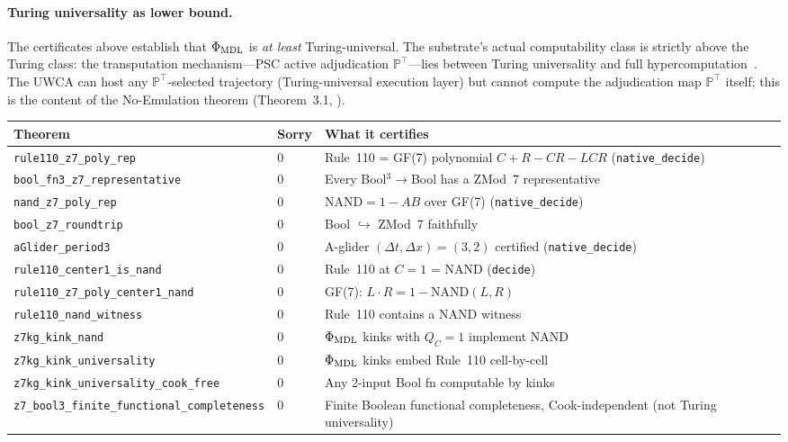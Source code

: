 \documentclass[11pt,a4paper]{article}
\theoremstyle{definition}
\begin{document}
\paragraph{Turing universality as lower bound.}
The certificates above establish that $\Phi_{\rm MDL}$ is \emph{at least}
Turing-universal. The substrate's actual computability class is strictly above
the Turing class: the transputation mechanism---PSC active adjudication
$\mathbb{P}^\top$---lies between Turing universality and full
hypercomputation~\cite{SpivackMFRR2026}. The UWCA can host any
$\mathbb{P}^\top$-selected trajectory (Turing-universal execution layer)
but cannot compute the adjudication map $\mathbb{P}^\top$ itself;
this is the content of the No-Emulation theorem (Theorem~3.1,
\cite{SpivackMFRR2026}).

\begin{table}[h]
\centering\small
\begin{tabular}{@{}p{6.5cm}p{1.8cm}p{6.7cm}@{}}
\toprule
Theorem & Sorry & What it certifies \\
\midrule
\lstinline|rule110_z7_poly_rep| & 0 & Rule~110 = GF(7) polynomial $C+R-CR-LCR$ (\lstinline|native_decide|) \\
\lstinline|bool_fn3_z7_representative| & 0 & Every Bool$^3\to$Bool has a ZMod~7 representative \\
\lstinline|nand_z7_poly_rep| & 0 & $\mathrm{NAND} = 1 - AB$ over GF(7) (\lstinline|native_decide|) \\
\lstinline|bool_z7_roundtrip| & 0 & Bool $\hookrightarrow$ ZMod~7 faithfully \\
\lstinline|aGlider_period3| & 0 & A-glider $(\Delta t,\Delta x)=(3,2)$ certified (\lstinline|native_decide|) \\
\lstinline|rule110_center1_is_nand| & 0 & Rule~110 at $C=1$ = NAND (\lstinline|decide|) \\
\lstinline|rule110_z7_poly_center1_nand| & 0 & GF(7): $L \cdot R = 1 - \mathrm{NAND}(L,R)$ \\
\lstinline|rule110_nand_witness| & 0 & Rule~110 contains a NAND witness \\
\lstinline|z7kg_kink_nand| & 0 & $\Phi_{\rm MDL}$ kinks with $Q_C=1$ implement NAND \\
\lstinline|z7kg_kink_universality| & 0 & $\Phi_{\rm MDL}$ kinks embed Rule~110 cell-by-cell \\
\lstinline|z7kg_kink_universality_cook_free| & 0 & Any 2-input Bool fn computable by kinks \\
\lstinline|z7_bool3_finite_functional_completeness| & 0 & Finite Boolean functional completeness, Cook-independent (not Turing universality) \\

\end{tabular}
\end{table}
\end{document}
